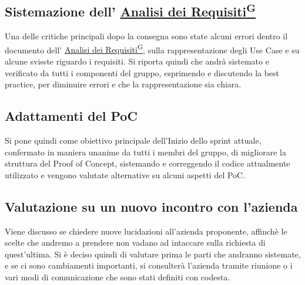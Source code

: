 \documentclass[a4paper,12pt]{article}
\providecommand{\glslink}[2]{\href{https://alittlebyte-19.github.io/Documentazione/glossario.html\#gls-#1}{\underline{#2}\textsuperscript{\scriptsize G}}}
\begin{document}
\subsection{Sistemazione dell' \glslink{analisi-dei-requisiti-adr}{Analisi dei Requisiti}}
Una delle critiche principali dopo la consegna sono state alcuni errori dentro il documento dell' \glslink{analisi-dei-requisiti-adr}{Analisi dei Requisiti}, sulla rappresentazione degli Use Case e su alcune svisste riguardo i requisiti. 
Si riporta quindi che andrà sistemato e verificato da tutti i componenti del gruppo, esprimendo e discutendo la best practice, per diminuire errori e che la rappresentazione sia chiara.

\subsection{Adattamenti del PoC}
Si pone quindi come obiettivo principale dell'Inizio dello sprint attuale, confermato in maniera unanime da tutti i membri del gruppo, di migliorare la struttura del Proof of Concept, sistemando e correggendo il codice attualmente
utilizzato e vengono valutate alternative su alcuni aspetti del PoC. 

\subsection{Valutazione su un nuovo incontro con l'azienda}
Viene discusso se chiedere nuove lucidazioni all'azienda proponente, affinchè le scelte che andremo a prendere non vadano ad intaccare sulla richiesta di quest'ultima. Si è deciso quindi di valutare prima le parti che andranno sistemate, e se ci
sono cambiamenti importanti, si consulterà l'azienda tramite riunione o i vari modi di comunicazione che sono stati definiti con codesta.
\end{document}
